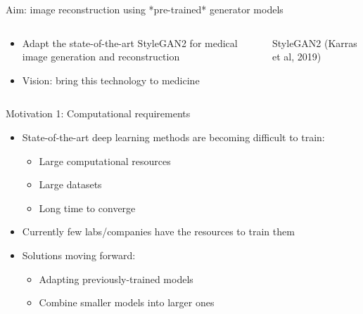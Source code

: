 \begin{frame}{Aim: image reconstruction using *pre-trained* generator models}

\begin{columns}
 \begin{column}{0.5\textwidth}
  
  \begin{itemize}
   \item Adapt the state-of-the-art StyleGAN2 for medical image generation and reconstruction

   \vspace{2em}
   
   \item Vision: bring this technology to medicine
  \end{itemize}
  
 \vspace{1em}
  
  
  
 \end{column} 
 
 \begin{column}{0.5\textwidth}
 \centering
 StyleGAN2 (Karras et al, 2019)
 \end{column}

\end{columns}



\end{frame}

\begin{frame}{Motivation 1: Computational requirements}

\begin{itemize}
 \item State-of-the-art deep learning methods are becoming difficult to train:
 \begin{itemize}
 \item Large computational resources
 \item Large datasets
 \item Long time to converge
 
\end{itemize}
\vo
 \item Currently few labs/companies have the resources to train them

\vo
 \item Solutions moving forward:
 \begin{itemize}
\item Adapting previously-trained models
\item Combine smaller models into larger ones
\end{itemize}
\end{itemize}

 
\end{frame}

